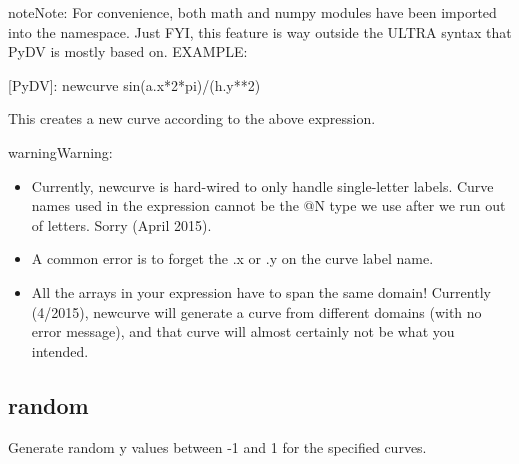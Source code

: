 \documentclass[letterpaper,10pt,english]{sphinxmanual}
\begin{document}
\begin{sphinxVerbatim}[commandchars=\\\{\}]
\PYG{p}{[}\PYG{p}{]}   
\end{sphinxVerbatim}

\begin{sphinxadmonition}{note}{Note:}
For convenience, both math and numpy modules have been imported into the namespace.
Just FYI, this feature is way outside the ULTRA syntax that PyDV is mostly based on.
EXAMPLE:

{[}PyDV{]}: newcurve sin(a.x*2*pi)/(h.y**2)

This creates a new curve according to the above expression. 
\end{sphinxadmonition}

\begin{sphinxadmonition}{warning}{Warning:}\begin{itemize}
\item {} 
Currently, newcurve is hard-wired to only handle single-letter labels.
Curve names used in the expression cannot be the @N type we use after
we run out of letters. Sorry (April 2015).

\item {} 
A common error is to forget the .x or .y on the curve label name.

\item {} 
All the arrays in your expression have to span the same domain! Currently (4/2015), newcurve
will generate a curve from different domains (with no error message), and that curve
will almost certainly not be what you intended.

\end{itemize}
\end{sphinxadmonition}


\subsection{random}
\label{\detokenize{curve_control_cmds:random}}
Generate random y values between -1 and 1 for the specified curves.

\begin{sphinxVerbatim}[commandchars=\\\{\}]
\PYG{p}{[}\PYG{p}{]}  
\end{sphinxVerbatim}
\end{document}
